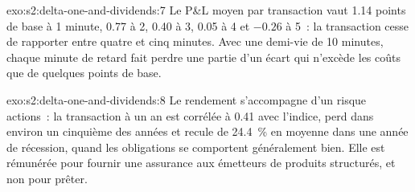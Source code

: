 \begin{solution}{exo:s2:delta-one-and-dividends:7}
Le P\&L moyen par transaction vaut 1.14 points de base à 1 minute, 0.77 à 2, 0.40 à 3, 0.05 à 4 et $-0.26$ à 5~: la transaction cesse de rapporter entre quatre et cinq
minutes. Avec une demi-vie de 10 minutes, chaque minute de retard fait perdre une partie d'un écart qui n'excède les coûts que de quelques points de base.
\end{solution}

\begin{solution}{exo:s2:delta-one-and-dividends:8}
Le rendement s'accompagne d'un risque actions~: la transaction à un an est corrélée à 0.41 avec l'indice, perd dans environ un cinquième des années et recule de 24.4~\% en moyenne dans une
année de récession, quand les obligations se comportent généralement bien. Elle est rémunérée pour fournir une assurance aux émetteurs de produits structurés, et non pour prêter.
\end{solution}

